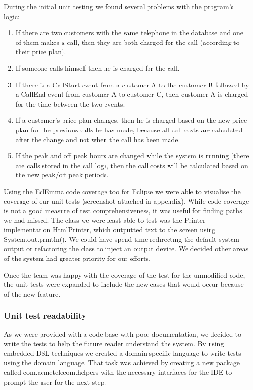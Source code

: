 \documentclass[pdftex,11pt,a4paper]{article}
\begin{document}
During the initial unit testing we found several problems with the program’s logic:

\begin{enumerate}
	\item If there are two customers with the same telephone in the database and one of them makes a call, then they are both charged for the call (according to their price plan).
	\item If someone calls himself then he is charged for the call.
	\item If there is a CallStart event from a customer A to the customer B followed by a CallEnd event from customer A to customer C, then customer A is charged for the time between the two events.
	\item If a customer’s price plan changes, then he is charged based on the new price plan for the previous calls he has made, because all call costs are calculated after the change and not when the call has been made.
	\item If the peak and off peak hours are changed while the system is running (there are calls stored in the call log), then the call costs will be calculated based on the new peak/off peak periods.
\end{enumerate}

Using the EclEmma code coverage too for Eclipse we were able to visualise the coverage of our unit tests (screenshot attached in appendix). While code coverage is not a good measure of test comprehensiveness, it was useful for finding paths we had missed. The class we were least able to test was the Printer implementation HtmlPrinter, which outputted text to the screen using System.out.println(). We could have spend time redirecting the default system output or refactoring the class to inject an output device. We decided other areas of the system had greater priority for our efforts.

Once the team was happy with the coverage of the test for the unmodified code, the unit tests were expanded to include the new cases that would occur because of the new feature.

\subsubsection{Unit test readability}
As we were provided with a code base with poor documentation, we decided to write the tests to help the future reader understand the system. By using embedded DSL techniques we created a domain-specific language to write tests using the domain language. That task was achieved by creating a new package called com.acmetelecom.helpers with the necessary interfaces for the IDE to prompt the user for the next step.
\end{document}
